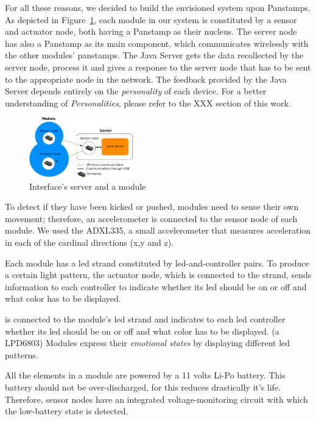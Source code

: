 For all these reasons, we decided to build the envisioned system upon Panstamps. As depicted in Figure~\ref{fig:server-module}, each module in our system is constituted by a sensor and actuator node, both having a Panstamp as their nucleus. The server node has also a Panstamp as its main component, which communicates wirelessly with the other modules' panstamps. The Java Server gets the data recollected by the server node, process it and gives a response to the server node that has to be sent to the appropriate node in the network. The feedback provided by the Java Server depends entirely on the \emph{personality} of each device. For a better understanding of \emph{Personalities}, please refer to the XXX section of this work.

\begin{figure}[h!]
 \centering
 \includegraphics[width= 0.4\textwidth, clip=true  ,keepaspectratio=true]{./graph/entity_server.png}
 \caption{Interface's server and a module}
 \label{fig:server-module}
\end{figure}

To detect if they have been kicked or pushed, modules need to sense their own movement; therefore, an accelerometer is connected to the sensor node of each module. We used the ADXL335, a small accelerometer that measures acceleration in each of the cardinal directions (x,y and z).

Each module has a led strand constituted by led-and-controller pairs. To produce a certain light pattern, the actuator node, which is connected to the strand, sends information to each controller to indicate whether its led should be on or off and what color has to be displayed. 


is connected to the module's led strand and indicates to each led controller whether its led should be on or off and what color has to be displayed.  (a LPD6803)
 Modules express  their \emph{emotional states} by displaying different led patterns.

All the elements in a module are powered by a 11 volts Li-Po battery. This battery should not be over-discharged, for this reduces drastically it's life. Therefore, sensor nodes have an integrated voltage-monitoring circuit with which the low-battery state is detected.

